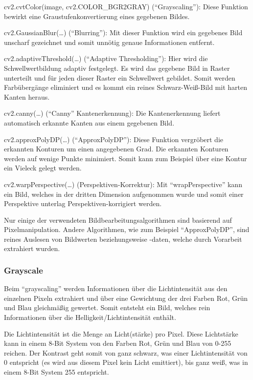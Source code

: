 \begin{compactitem}
    \item cv2.cvtColor(image, cv2.COLOR\_BGR2GRAY) (``Grayscaling''): Diese Funktion bewirkt eine Graustufenkonvertierung eines gegebenen Bildes.
    \item cv2.GaussianBlur(\dots) (``Blurring''): Mit dieser Funktion wird ein gegebenes Bild unscharf gezeichnet und somit unnötig genaue Informationen entfernt.
    \item cv2.adaptiveThreshold(\dots) (``Adaptive Thresholding''): Hier wird die Schwellwertbildung adaptiv festgelegt. Es wird das gegebene Bild in Raster unterteilt und für jeden dieser Raster ein Schwellwert gebildet. Somit werden Farbübergänge eliminiert und es kommt ein reines Schwarz-Weiß-Bild mit harten Kanten heraus.
    \item cv2.canny(\dots) (``Canny'' Kantenerkennung): Die Kantenerkennung liefert automatisch erkannte Kanten aus einem gegebenen Bild.
    \item cv2.approxPolyDP(\dots) (``ApproxPolyDP''): Diese Funktion vergröbert die erkannten Konturen um einen angegebenen Grad. Die erkannten Konturen werden auf wenige Punkte minimiert. Somit kann zum Beispiel über eine Kontur ein Vieleck gelegt werden.
    \item cv2.warpPerspective(\dots) (Perspektiven-Korrektur): Mit ``wrapPerspective'' kann ein Bild, welches in der dritten Dimension aufgenommen wurde und somit einer Perspektive unterlag Perspektiven-korrigiert werden.
\end{compactitem}

Nur einige der verwendeten Bildbearbeitungsalgorithmen sind basierend auf Pixelmanipulation. Andere Algorithmen, wie zum Beispiel ``ApproxPolyDP'', sind reines Auslesen von Bildwerten beziehungsweise -daten, welche durch Vorarbeit extrahiert wurden.


\subsubsection{Grayscale}\label{maai:grayscale}
Beim ``grayscaling'' werden Informationen über die Lichtintensität aus den einzelnen Pixeln extrahiert und über eine Gewichtung der drei Farben Rot, Grün und Blau gleichmäßig gewertet. Somit entsteht ein Bild, welches rein Informationen über die Helligkeit/Lichtintensität enthält.

Die Lichtintensität ist die Menge an Licht(stärke) pro Pixel. Diese Lichtstärke kann in einem 8-Bit System von den Farben Rot, Grün und Blau von 0-255 reichen. Der Kontrast geht somit von ganz schwarz, was einer Lichtintensität von 0 entspricht (es wird aus diesem Pixel kein Licht emittiert), bis ganz weiß, was in einem 8-Bit System 255 entspricht.

